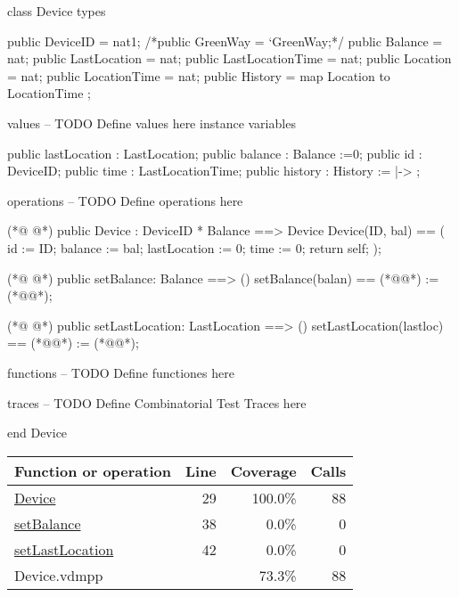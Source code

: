 \begin{vdmpp}
class Device
types

 public DeviceID = nat1;
 /*public GreenWay = `GreenWay;*/
 public Balance = nat;
 public LastLocation = nat;
 public LastLocationTime = nat;
 public Location = nat;
 public LocationTime = nat;
 public History = map Location to LocationTime ;
 

values
-- TODO Define values here
instance variables

 public lastLocation : LastLocation;
 public balance : Balance :=0;
 public id : DeviceID;
 public time : LastLocationTime;
 public history : History := { |-> };
 
 

operations
-- TODO Define operations here

(*@
\label{Device:29}
@*)
 public Device : DeviceID * Balance ==> Device
  Device(ID, bal) == (  
  id := ID;
  balance := bal;
  lastLocation := 0;
  time := 0;
  return self;
  );
  
(*@
\label{setBalance:38}
@*)
 public setBalance: Balance ==> ()
 setBalance(balan) ==
  (*@@*) := (*@@*);
  
(*@
\label{setLastLocation:42}
@*)
 public setLastLocation: LastLocation ==> ()
 setLastLocation(lastloc) ==
  (*@@*) := (*@@*); 
  
 
  
functions
-- TODO Define functiones here


traces
-- TODO Define Combinatorial Test Traces here

end Device
\end{vdmpp}
\bigskip
\begin{longtable}{|l|r|r|r|}
\hline
Function or operation & Line & Coverage & Calls \\
\hline
\hline
\hyperref[Device:29]{Device} & 29&100.0\% & 88 \\
\hline
\hyperref[setBalance:38]{setBalance} & 38&0.0\% & 0 \\
\hline
\hyperref[setLastLocation:42]{setLastLocation} & 42&0.0\% & 0 \\
\hline
\hline
Device.vdmpp & & 73.3\% & 88 \\
\hline
\end{longtable}

